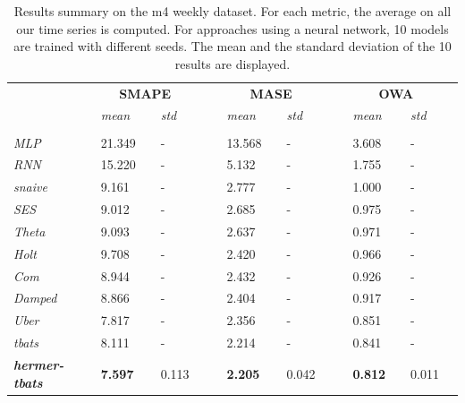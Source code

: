 \documentclass[lettersize,journal]{IEEEtran}
\begin{document}
\begin{table}
  \caption{Results summary on the m4 weekly dataset. For each metric, the average on all our time series is computed. For approaches using a neural network, 10 models are trained with different seeds. The mean and the standard deviation of the 10 results are displayed.}
  \centering
  \begin{tabular}{l||lllll|lllll|lllll}
   &&\multicolumn{3}{c}{\textbf{SMAPE}} &&& \multicolumn{3}{c}{\textbf{MASE}} &&& \multicolumn{3}{c}{\textbf{OWA}}&\\
    &&  \textit{mean}  && \textit{std} &&&  \textit{mean}  && \textit{std}&&&  \textit{mean}  && \textit{std}& \\
	 \hline
	 &&&&&&&&&&\\
     \textit{MLP} && 21.349 && - &&& 13.568 && - &&& 3.608 && - &\\
     \textit{RNN} && 15.220 && - &&& 5.132 && - &&& 1.755 && - &\\
     \textit{snaive} && 9.161 && - &&& 2.777 && - &&& 1.000 && - &\\
     \textit{SES} && 9.012 && - &&& 2.685 && - &&& 0.975 && - &\\
     \textit{Theta} && 9.093 && - &&& 2.637 && - &&& 0.971 && - &\\
     \textit{Holt} && 9.708 && - &&& 2.420 && - &&& 0.966 && - &\\
     \textit{Com} && 8.944 && - &&& 2.432 && - &&& 0.926 && - &\\
     \textit{Damped} && 8.866 && - &&& 2.404 && - &&& 0.917 && - &\\
     \textit{Uber} && 7.817 && - &&& 2.356 && - &&& 0.851 && - &\\
     \textit{tbats} && 8.111 && - &&& 2.214 && - &&& 0.841 && - &\\
     \textit{\textbf{hermer-tbats}} && \textbf{7.597} && 0.113 &&& \textbf{2.205} && 0.042 &&& \textbf{0.812} && 0.011 &\\
  \end{tabular}
\label{tab:m4metricresults}
\end{table}
\end{document}
